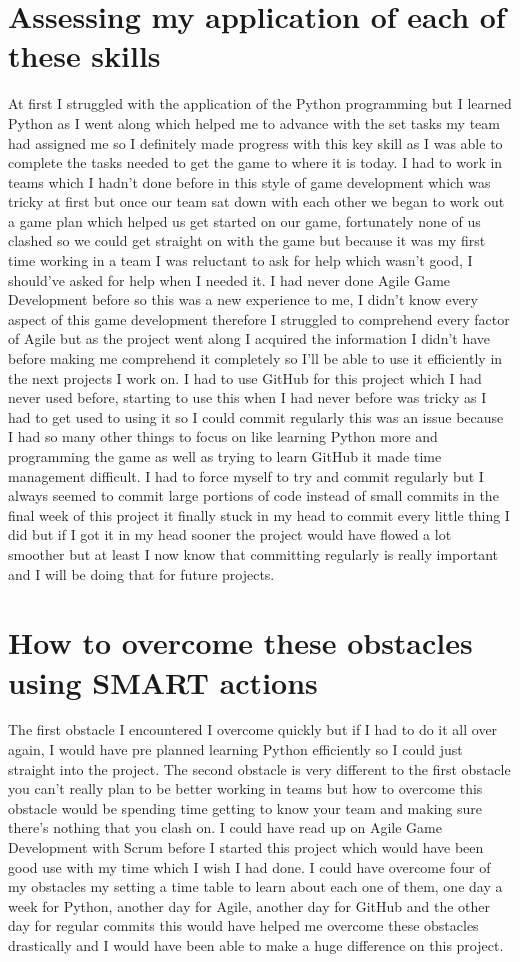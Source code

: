 \documentclass{scrartcl}
\begin{document}
\section{Assessing my application of each of these skills}
At first I struggled with the application of the Python programming but I learned Python as I went along which helped me to advance with the set tasks my team had assigned me so I definitely made progress with this key skill as I was able to complete the tasks needed to get the game to where it is today. I had to work in teams which I hadn’t done before in this style of game development which was tricky at first but once our team sat down with each other we began to work out a game plan which helped us get started on our game, fortunately none of us clashed so we could get straight on with the game but because it was my first time working in a team I was reluctant to ask for help which wasn’t good, I should’ve asked for help when I needed it. I had never done Agile Game Development before so this was a new experience to me, I didn’t know every aspect of this game development therefore I struggled to comprehend every factor of Agile but as the project went along I acquired the information I didn’t have before making me comprehend it completely so I’ll be able to use it efficiently in the next projects I work on. I had to use GitHub for this project which I had never used before, starting to use this when I had never before was tricky as I had to get used to using it so I could commit regularly this was an issue because I had so many other things to focus on like learning Python more and programming the game as well as trying to learn GitHub it made time management difficult. I had to force myself to try and commit regularly but I always seemed to commit large portions of code instead of small commits in the final week of this project it finally stuck in my head to commit every little thing I did but if I got it in my head sooner the project would have flowed a lot smoother but at least I now know that committing regularly is really important and I will be doing that for future projects.

\section{How to overcome these obstacles using SMART actions}
The first obstacle I encountered I overcome quickly but if I had to do it all over again, I would have pre planned learning Python efficiently so I could just straight into the project. The second obstacle is very different to the first obstacle you can’t really plan to be better working in teams but how to overcome this obstacle would be spending time getting to know your team and making sure there’s nothing that you clash on. I could have read up on Agile Game Development with Scrum before I started this project which would have been good use with my time which I wish I had done. I could have overcome four of my obstacles my setting a time table to learn about each one of them, one day a week for Python, another day for Agile, another day for GitHub and the other day for regular commits this would have helped me overcome these obstacles drastically and I would have been able to make a huge difference on this project.




\end{document}
